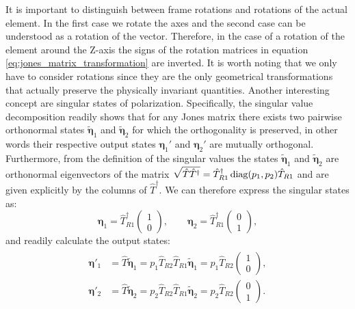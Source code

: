 It is important to distinguish between frame rotations and rotations of the actual element. In the first case we rotate the axes and the second case can be understood as a rotation of the vector. Therefore, in the case of a rotation of the element around the Z-axis the signs of the rotation matrices in equation \ref{eq:jones_matrix_transformation} are inverted. It is worth noting that we only have to consider rotations since they are the only geometrical transformations that actually preserve the physically invariant quantities. Another interesting concept are singular states of polarization. Specifically, the singular value decomposition readily shows that for any Jones matrix there exists two pairwise orthonormal states $\tilde{\bm{\eta}}_1$ and $\tilde{\bm{\eta}}_2$ for which the orthogonality is preserved, in other words their respective output states $\bm{\eta}_1'$ and $\bm{\eta}_2'$ are mutually orthogonal. Furthermore, from the definition of the singular values the states $\tilde{\bm{\eta}}_1$ and $\tilde{\bm{\eta}}_2$ are orthonormal eigenvectors of the matrix $\sqrt{\hat{T}\hat{T}^{\dagger}}=\hat{T}_{R1}^{\dagger}\operatorname{diag}(p_1, p_2)\hat{T}_{R1}$ and are given explicitly by the columns of $\hat{T}^{\dagger}$. We can therefore express the singular states as:
\begin{equation}
    \bm{\eta}_1 = \hat{T}^{\dagger}_{R1}\begin{pmatrix} 1 \\ 0 \end{pmatrix}, \qquad
    \bm{\eta}_2 = \hat{T}^{\dagger}_{R1}\begin{pmatrix} 0 \\ 1 \end{pmatrix},
\end{equation}
and readily calculate the output states:
\begin{align}
\begin{split}
    \bm{\eta}'_1 &= \hat{T}\tilde{\bm{\eta}}_1 = 
    p_1\hat{T}_{R2}\hat{T}_{R1}\tilde{\bm{\eta}}_1 =
    p_1\hat{T}_{R2}\begin{pmatrix} 1 \\ 0 \end{pmatrix}, \\
    \bm{\eta}'_2 &= \hat{T}\tilde{\bm{\eta}}_2 = 
    p_2\hat{T}_{R2}\hat{T}_{R1}\tilde{\bm{\eta}}_2 =
    p_2\hat{T}_{R2}\begin{pmatrix} 0 \\ 1 \end{pmatrix}.
\end{split}
\end{align}
